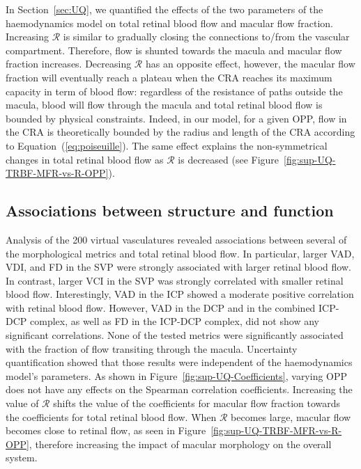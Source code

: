 \documentclass[11pt,]{article}
\begin{document}
In Section~\ref{sec:UQ}, we quantified the effects of the two parameters of the haemodynamics model on total retinal blood flow and macular flow fraction.
Increasing $\mathcal R$ is similar to gradually closing the connections to/from the vascular compartment.
Therefore, flow is shunted towards the macula and macular flow fraction increases.
Decreasing $\mathcal R$ has an opposite effect, however, the macular flow fraction will eventually reach a plateau when the CRA reaches its maximum capacity in term of blood flow: regardless of the resistance of paths outside the macula, blood will flow through the macula and total retinal blood flow is bounded by physical constraints.
Indeed, in our model, for a given OPP, flow in the CRA is theoretically bounded by the radius and length of the CRA according to Equation~(\ref{eq:poiseuille}).
The same effect explains the non-symmetrical changes in total retinal blood flow as $\mathcal R$ is decreased (see Figure~\ref{fig:sup-UQ-TRBF-MFR-vs-R-OPP}). 

\subsection{Associations between structure and function}\label{sec:disc-results}

Analysis of the \SI{200}{} virtual vasculatures revealed associations between several of the morphological metrics and total retinal blood flow.
In particular, larger VAD, VDI, and FD in the SVP were strongly associated with larger retinal blood flow.
In contrast, larger VCI in the SVP was strongly correlated with smaller retinal blood flow.
Interestingly, VAD in the ICP showed a moderate positive correlation with retinal blood flow.
However, VAD in the DCP and in the combined ICP-DCP complex, as well as FD in the ICP-DCP complex, did not show any significant correlations.
None of the tested metrics were significantly associated with the fraction of flow transiting through the macula.
Uncertainty quantification showed that those results were independent of the haemodynamics model's parameters.
As shown in Figure~\ref{fig:sup-UQ-Coefficients}, varying OPP does not have any effects on the Spearman correlation coefficients.
Increasing the value of $\mathcal R$ shifts the value of the coefficients for macular flow fraction towards the coefficients for total retinal blood flow.
When $\mathcal R$ becomes large, macular flow becomes close to retinal flow, as seen in Figure~\ref{fig:sup-UQ-TRBF-MFR-vs-R-OPP}, therefore increasing the impact of macular morphology on the overall system. 
\end{document}
